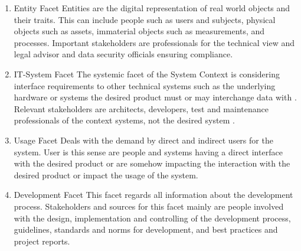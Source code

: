 \begin{enumerate}
    \item{Entity Facet} 
    Entities are the digital representation of real world objects and their traits. This can include people such as users and subjects, physical objects such as assets, immaterial objects such as measurements, and processes. Important stakeholders are  professionals for the technical view and legal advisor and data security officials ensuring compliance. \parencite[cf.][70-71]{Pohl.2007}
    \item{IT-System Facet}
    The systemic facet of the System Context is considering interface requirements to other technical systems such as the underlying hardware or systems the desired product must or may interchange data with \parencite[cf.][192]{Kotonya.2000}. Relevant stakeholders are architects, developers, test and maintenance professionals of the context systems, not the desired system \parencite[cf.][72]{Pohl.2007}.
    \item{Usage Facet} Deals with the demand by direct and indirect users for the system. User is this sense are people and systems having a direct interface with the desired product or are somehow impacting the interaction with the desired product or impact the usage of the system. \parencite[cf.][75-77]{Pohl.2007}
    \item{Development Facet}
    This facet regards all information about the development process. Stakeholders and sources for this facet mainly are people involved with the design, implementation and controlling of the development process, guidelines, standards and norms for development, and best practices and project reports. \parencite[cf.][79]{Pohl.2007}
\end{enumerate}

